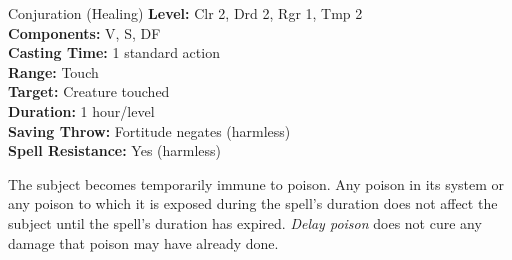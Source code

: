 {Conjuration (Healing)}
{
	\textbf{Level:}
	Clr 2, Drd 2, Rgr 1, Tmp 2\\
	\textbf{Components:}
	V, S, DF\\
	\textbf{Casting Time:}
	1 standard action\\
	\textbf{Range:}
	Touch\\
	\textbf{Target:}
	Creature touched\\
	\textbf{Duration:}
	1 hour/level\\
	\textbf{Saving Throw:}
	Fortitude negates (harmless)\\
	\textbf{Spell Resistance:}
	Yes (harmless)\\
}
{
	The subject becomes temporarily immune to poison. Any poison in its system or any poison to which it is exposed during the spell's duration does not affect the subject until the spell's duration has expired. \emph{Delay poison} does not cure any damage that poison may have already done.

}
